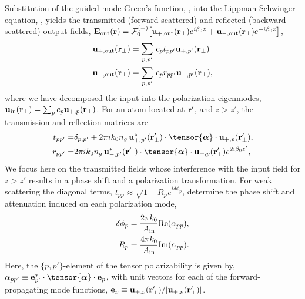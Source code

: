 \documentclass[preprint, aps,pra,onecolumn]{revtex4-1} %
\newcommand{\out}{{\rm out}}
\newcommand{\fwd}{+}
\newcommand{\bwd}{-}
\newcommand{\trans}{+}
\newcommand{\refl}{-}
\newcommand{\Eamp}{\mathcal{F}_0^{(+)}}
\begin{document}
Substitution of the guided-mode Green's function, , into the Lippman-Schwinger equation, , yields the transmitted (forward-scattered) and reflected (backward-scattered) output fields, $\mathbf{E}_{\out}(\br) = \Eamp \big[ \mathbf{u}_{\trans, \out} (\br_\perp) e^{i \beta_0 z} + \mathbf{u}_{\refl,\out} (\br_\perp) e^{-i \beta_0 z} \big]$, 
	\begin{align}
		\mathbf{u}_{\trans, \out} (\br_\perp) &=  \sum_{p,p'}  \, c_{p} t_{pp'} \mathbf{u}_{\fwd, p'}(\br_\perp) \\ 
		\mathbf{u}_{\refl,\out} (\br_\perp) &=  \sum_{p,p'}  \, c_{p} r_{pp'} \mathbf{u}_{\bwd, p'}(\br_\perp),
	\end{align}
where we have decomposed the input into the polarization eigenmodes, $\mbf{u}_{\rm in}(\mbf{r}_\perp) = \sum_{p} c_{p} \mathbf{u}_{\fwd,p}(\br_\perp)$.  
For an atom located at $\mathbf{r}'$, and $z>z'$, the transmission and reflection matrices are 
	\begin{align} \label{Eq::PolarizationTransformation}
		t_{pp'} =& \delta_{p,p'} +  2\pi i k_0 n_g \, \mathbf{u}^*_{+, p'}(\br'_\perp) \cdot 
\tensor{\boldsymbol{\alpha}} \cdot \mathbf{u}_{+, p}(\br'_\perp) , \\
		r_{pp'} =&  2\pi i k_0 n_g \, \mathbf{u}^*_{\bwd, p'}(\br'_\perp) \cdot 
\tensor{\boldsymbol{\alpha}} \cdot \mathbf{u}_{\fwd, p}(\br'_\perp) e^{2 i\beta_0 z'} , 
	\end{align} 
We focus here on the transmitted fields whose interference with the input field for $z>z'$ results in a phase shift and a polarization transformation.  
For weak scattering the diagonal terms, $t_{p p} \approx \sqrt{1-R_p}e^{i \delta \phi_p}$, determine the phase shift and attenuation induced on each polarization mode,
	\begin{align}
		 \delta \phi_p &= \frac{2 \pi k_0}{A_{\rm in}} {\rm Re}(\alpha_{pp}),  \label{Eq::PhaseShift} \\
		R_p &=  \frac{4 \pi k_0}{A_{\rm in}} {\rm Im}(\alpha_{pp}) .\label{Eq::Attenuation} 
	\end{align} 
Here, the $\{p,p'\}$-element of the tensor polarizability is given by, $\alpha_{pp'} \equiv \mathbf{e}^*_{p'} \cdot \tensor{\boldsymbol{\alpha}}\cdot \mathbf{e}_{p}$, with unit vectors for each of the forward-propagating mode functions, $\mathbf{e}_{p}\equiv \mathbf{u}_{+,p}(\mathbf{r}'_\perp)/|\mathbf{u}_{+,p}(\mathbf{r}'_\perp)|$. 
\end{document}
